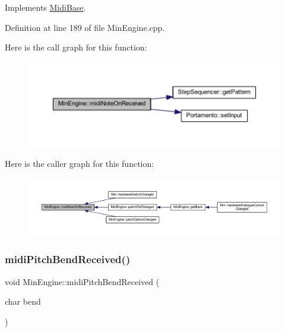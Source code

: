 Implements \hyperlink{class_midi_base_aa977f9f3db59b0a8b892ee28bcf93695}{Midi\+Base}.



Definition at line 189 of file Min\+Engine.\+cpp.

Here is the call graph for this function\+:
\nopagebreak
\begin{figure}[H]
\begin{center}
\leavevmode
\includegraphics[width=350pt]{class_min_engine_a108d70cfac8c363fbf6445f679dcf4d5_cgraph}
\end{center}
\end{figure}
Here is the caller graph for this function\+:
\nopagebreak
\begin{figure}[H]
\begin{center}
\leavevmode
\includegraphics[width=350pt]{class_min_engine_a108d70cfac8c363fbf6445f679dcf4d5_icgraph}
\end{center}
\end{figure}
\mbox{\label{class_min_engine_a5b0f6a252cc4958e81d8989872105544}} 
\subsubsection{\texorpdfstring{midi\+Pitch\+Bend\+Received()}{midiPitchBendReceived()}}
{\footnotesize\ttfamily void Min\+Engine\+::midi\+Pitch\+Bend\+Received (\begin{DoxyParamCaption}\item[{char}]{bend }\end{DoxyParamCaption})\hspace{0.3cm}{\ttfamily [virtual]}}



